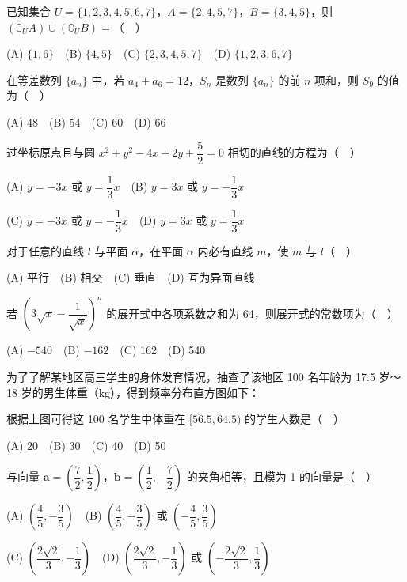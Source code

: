 \begin{question}
已知集合 \(U=\{1,2,3,4,5,6,7\}\)，\(A=\{2,4,5,7\}\)，\(B=\{3,4,5\}\)，则 \((\complement_U A)\cup(\complement_U B)=\)（　）

(A) \(\{1,6\}\)　(B) \(\{4,5\}\)　(C) \(\{2,3,4,5,7\}\)　(D) \(\{1,2,3,6,7\}\)

\end{question}
\begin{question}
在等差数列 \(\{a_n\}\) 中，若 \(a_4+a_6=12\)，\(S_n\) 是数列 \(\{a_n\}\) 的前 \(n\) 项和，则 \(S_9\) 的值为（　）

(A) 48　(B) 54　(C) 60　(D) 66

\end{question}
\begin{question}
过坐标原点且与圆 \(x^2+y^2-4x+2y+\dfrac52=0\) 相切的直线的方程为（　）

(A) \(y=-3x\) 或 \(y=\dfrac13x\)　(B) \(y=3x\) 或 \(y=-\dfrac13x\)

(C) \(y=-3x\) 或 \(y=-\dfrac13x\)　(D) \(y=3x\) 或 \(y=\dfrac13x\)

\end{question}
\begin{question}
对于任意的直线 \(l\) 与平面 \(\alpha\)，在平面 \(\alpha\) 内必有直线 \(m\)，使 \(m\) 与 \(l\)（　）

(A) 平行　(B) 相交　(C) 垂直　(D) 互为异面直线

\end{question}
\begin{question}
若 \(\left(3\sqrt{x}-\dfrac1{\sqrt{x}}\right)^n\) 的展开式中各项系数之和为 64，则展开式的常数项为（　）

(A) \(-540\)　(B) \(-162\)　(C) 162　(D) 540

\Needspace{0.4\textheight}
\end{question}
\begin{question}
为了了解某地区高三学生的身体发育情况，抽查了该地区 100 名年龄为 17.5 岁～18 岁的男生体重（kg），得到频率分布直方图如下：
\nopagebreak[4]
\begin{center}\end{center}
\nopagebreak[4]
根据上图可得这 100 名学生中体重在 \([56.5,64.5)\) 的学生人数是（　）

(A) 20　(B) 30　(C) 40　(D) 50

\end{question}
\begin{question}
与向量 \(\boldsymbol a=\left(\dfrac72,\dfrac12\right)\)，\(\boldsymbol b=\left(\dfrac12,-\dfrac72\right)\) 的夹角相等，且模为 1 的向量是（　）

(A) \(\left(\dfrac45,-\dfrac35\right)\)　(B) \(\left(\dfrac45,-\dfrac35\right)\) 或 \(\left(-\dfrac45,\dfrac35\right)\)

(C) \(\left(\dfrac{2\sqrt2}{3},-\dfrac13\right)\)　(D) \(\left(\dfrac{2\sqrt2}{3},-\dfrac13\right)\) 或 \(\left(-\dfrac{2\sqrt2}{3},\dfrac13\right)\)

\end{question}
